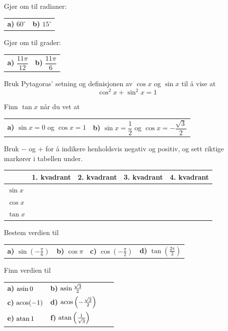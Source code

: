 




\opgt
\setcounter{section}{1}	
Gjør om til radianer:\os
\begin{tabular}{@{}l l}
	\textbf{a)} $ 60^\circ $ & \quad \textbf{b)} $ 15^\circ $
\end{tabular}

Gjør om til grader:\os

\begin{tabular}{@{}l l}
	\textbf{a)} $ \dfrac{11\pi}{12} $ & \quad \textbf{b)} $ \dfrac{11\pi}{6} $
\end{tabular}

\nes
{}
Bruk Pytagoras' setning og definisjonen av $ \cos x $ og $ \sin x $ til å vise at
\[ \cos^2 x + \sin^2 x = 1 \] 

Finn $\tan x $ når du vet at\\
\begin{tabular}{@{}l l}
	\textbf{a)} $ \sin x = 0$ og $ \cos x=1 $ & \quad \textbf{b)} $ \sin x = \dfrac{1}{2} $ og $ \cos x = -\dfrac{\sqrt{3}}{2} $
\end{tabular}
\newpage
{}
Bruk $ - $ og $ + $ for å indikere henholdsvis negativ og positiv, og sett riktige markører i tabellen under.\os

\begin{tabular}{@{}l|l| l| l|l|}
&1. kvadrant & 2. kvadrant & 3. kvadrant & 4. kvadrant\\ \hline
$ \sin x $& & & &\\ \hline
$ \cos x $& & & &\\ \hline
$ \tan x $& & & &\\\hline
\end{tabular}

Bestem verdien til\os
\begin{tabular}{@{}l l l l }
\textbf{a)} $ \sin\left(-\frac{\pi}{6}\right) $ &\quad \textbf{b)} $ \cos \pi $ &\quad \textbf{c)} $ \cos\left(-\frac{\pi}{2}\right) $&\quad \textbf{d)} $ \tan\left(\frac{2\pi}{3}\right) $
\end{tabular}

Finn verdien til\\ \renewcommand{\arraystretch}{1.7}
\begin{tabular}{@{}l l l l }	
\textbf{a)} $ \operatorname{asin} 0 $ &\quad\textbf{b)} $ \operatorname{asin} \frac{\sqrt{3}}{2} $ \\
 \textbf{c)} $ \operatorname{acos} (-1) $ &\quad\textbf{d)} $ \operatorname{acos} \left(-\frac{\sqrt{2}}{2}\right) $ \\
 \textbf{e)} $ \operatorname{atan} 1 $ &\quad\textbf{f)} $ \operatorname{atan} \left(\frac{1}{\sqrt{3}}\right) $
\end{tabular}\renewcommand{\arraystretch}{1}


